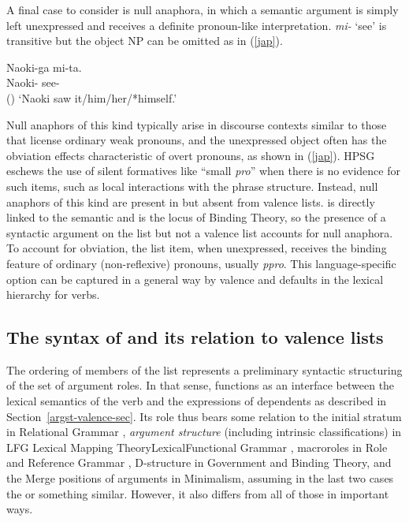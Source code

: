 \documentclass[output=paper
 	        ,biblatex
                ,babelshorthands
                ,newtxmath
                ,draftmode
                ,colorlinks, citecolor=brown
]{langscibook}
\begin{document}
A final case to consider is null anaphora, in which a semantic argument is simply left unexpressed
and receives a definite pronoun-like interpretation.   \textit{mi-} `see' is
transitive but the object NP can be omitted as in (\ref{jap}).

\ea
\label{jap}
\gll Naoki-ga       mi-ta.  \\
     Naoki- see-  \\\hfill()
\glt `Naoki saw it/him/her/*himself.'
\z

\noindent
Null anaphors of this kind typically arise in discourse contexts similar to those that license
ordinary weak pronouns, and the unexpressed object often has the obviation effects characteristic of
overt pronouns, as shown in (\ref{jap}).  HPSG eschews the use of silent formatives
like ``small \textit{pro}'' when there is no evidence for such items, such as local interactions with
the phrase structure.  Instead, null anaphors of this kind are present in \argst but absent from
valence lists.  \argst is directly linked to the semantic \content and is the locus of Binding Theory,
so the presence of a syntactic argument on the \argst list but not a valence list accounts for null
anaphora. To account for obviation, the \argst list item, when unexpressed, receives the
binding feature of ordinary (non-reflexive) pronouns, usually \textit{ppro}.  This language-specific
option can be captured in a general way by valence and \argst defaults in the lexical hierarchy for
verbs.

\subsection{The syntax of  \texorpdfstring{\argst}{ARG-ST} and its relation to  valence lists}
\label{argst-sec}


The ordering of members of the \argst list represents a preliminary syntactic structuring of the set
of argument roles.  In that sense, \argst functions as an interface between the lexical semantics of
the verb and the expressions of dependents as described in Section~\ref{argst-valence-sec}.  Its
role thus bears some relation to the initial stratum in Relational Grammar
\citep{PerlmutterandPostal1984}, \textit{argument structure} (including
intrinsic classifications) in LFG Lexical Mapping TheoryLexical\indexlfg Functional Grammar
\citep{Bresnan+etal:2015}, macroroles in Role and Reference Grammar \citep{VanValinandLapolla1997},
D-structure in Government and Binding Theory, and the Merge positions of arguments in
Minimalism, assuming in the last two cases the 
\citep[46]{Baker1988} or something similar.  However, it also differs from all of those in important
ways.
\end{document}
